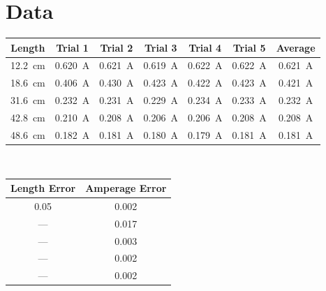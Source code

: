 \documentclass[a4paper]{article}
\numberwithin{equation}{subsection}
\begin{document}
    \section{Data}
        \begin{tabular}{|c|||c|c|c|c|c||c|}
            \hline
            \bfseries Length & \bfseries Trial 1 & \bfseries Trial 2 & \bfseries Trial 3 & \bfseries Trial 4 & \bfseries Trial 5 & \bfseries Average
            \\\hline
            \SI{12.2}{\cm} & \SI{0.620}{\A} & \SI{0.621}{\A} & \SI{0.619}{\A} & \SI{0.622}{\A} & \SI{0.622}{\A} & \SI{0.621}{\A}
            \\\hline
            \SI{18.6}{\cm} & \SI{0.406}{\A} & \SI{0.430}{\A} & \SI{0.423}{\A} & \SI{0.422}{\A} & \SI{0.423}{\A} & \SI{0.421}{\A}
            \\\hline
            \SI{31.6}{\cm} & \SI{0.232}{\A} & \SI{0.231}{\A} & \SI{0.229}{\A} & \SI{0.234}{\A} & \SI{0.233}{\A} & \SI{0.232}{\A}
            \\\hline
            \SI{42.8}{\cm} & \SI{0.210}{\A} & \SI{0.208}{\A} & \SI{0.206}{\A} & \SI{0.206}{\A} & \SI{0.208}{\A} & \SI{0.208}{\A}
            \\\hline
            \SI{48.6}{\cm} & \SI{0.182}{\A} & \SI{0.181}{\A} & \SI{0.180}{\A} & \SI{0.179}{\A} & \SI{0.181}{\A} & \SI{0.181}{\A}
            \\\hline
        \end{tabular}
        \\
        \begin{tabular}{|c|c|}
            \hline
            \bfseries Length Error & \bfseries Amperage Error
            \\\hline
            0.05 & 0.002
            \\\hline
            --- & 0.017
            \\\hline
            --- & 0.003
            \\\hline
            --- & 0.002
            \\\hline
            --- & 0.002
            \\\hline
        \end{tabular}
        \\
\end{document}
